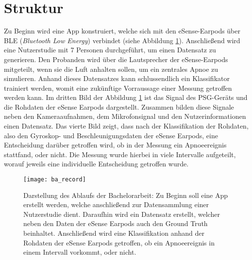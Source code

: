 \section{Struktur}
Zu Beginn wird eine App konstruiert, welche sich mit den eSense-Earpods über BLE (\textit{Bluetooth Low Energy}) verbindet (siehe Abbildung \ref{introduction:ba_record}).
Anschließend wird eine Nutzerstudie mit 7 Personen durchgeführt, um einen Datensatz zu generieren.
Den Probanden wird über die Lautsprecher der eSense-Earpods mitgeteilt, wenn sie die Luft anhalten sollen, um ein zentrales Apnoe zu simulieren.
Anhand dieses Datensatzes kann schlussendlich ein Klassifikator trainiert werden, womit eine zukünftige Vorraussage einer Messung getroffen werden kann.
Im dritten Bild der Abbildung \ref{introduction:ba_record} ist das Signal des PSG-Geräts  und die Rohdaten der eSense Earpods dargestellt. 
Zusammen bilden diese Signale neben den Kameraaufnahmen, dem Mikrofonsignal und den Nutzerinformationen einen Datensatz.
Das vierte Bild zeigt, dass nach der Klassifikation der Rohdaten, also den Gyroskop- und Beschleunigungsdaten der eSense Earpods, eine Entscheidung darüber getroffen wird, ob in der Messung ein Apnoeereignis stattfand, oder nicht.
Die Messung wurde hierbei in viele Intervalle aufgeteilt, worauf jeweils eine individuelle Entscheidung getroffen wurde.

\begin{figure}[h]
  \centering
  \texttt{[image: ba\_record]}
  \caption{Darstellung des Ablaufs der Bachelorarbeit: Zu Beginn soll eine App erstellt werden, welche anschließend zur Datensammlung einer Nutzerstudie dient. Daraufhin wird ein Datensatz erstellt, welcher neben den Daten der eSense Earpods auch den Ground Truth beinhaltet. Anschließend wird eine Klassifikation anhand der Rohdaten der eSense Earpods getroffen, ob ein Apnoeereignis in einem Intervall vorkommt, oder nicht.}
  \label{introduction:ba_record}
\end{figure}